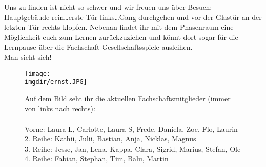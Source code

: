 Uns zu finden ist nicht so schwer und wir freuen uns über Besuch:\\
Hauptgebäude rein\ldots erste Tür links\ldots Gang durchgehen und vor der Glastür an der letzten Tür rechts klopfen. Nebenan findet ihr mit dem Phasenraum eine Möglichkeit euch zum Lernen zurückzuziehen und könnt dort sogar für die Lernpause über die Fachschaft Gesellschaftsspiele ausleihen.\\
Man sieht sich!
\newpage
\begin{figure}
	\centering
	\texttt{[image: \\imgdir/ernst.JPG]}
	\captionsetup{labelformat=empty}
	\caption{
		Auf dem Bild seht ihr die aktuellen Fachschaftsmitglieder (immer von links nach rechts):\\\\
		Vorne: Laura L, Carlotte, Laura S, Frede, Daniela, Zoe, Flo, Laurin\\
		2. Reihe: Kathii, Julii, Bastian, Anja, Nicklas, Magnus\\
		3. Reihe: Jesse, Jan, Lena, Kappa, Clara, Sigrid, Marius, Stefan, Ole\\
		4. Reihe: Fabian, Stephan, Tim, Balu, Martin\\
	}
\end{figure}